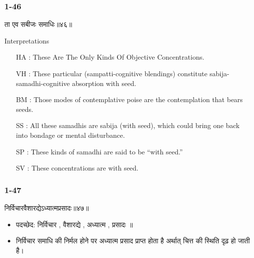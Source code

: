 \begin{frame}[fragile]\frametitle{1-46}
\begin{sanskrit}
ता एव सबीजः समाधिः॥४६॥
\end{sanskrit}

Interpretations
\begin{itemize}
\item [HA]: These Are The Only Kinds Of Objective Concentrations.
\item [VH]: These particular (sampatti-cognitive blendings) constitute sabija-samadhi-cognitive absorption with seed.
\item [BM]: Those modes of contemplative poise are the contemplation that bears seeds.
\item [SS]: All these samadhis are sabija (with seed), which could bring one back into bondage or mental disturbance.
\item [SP]: These kinds of samadhi are said to be “with seed.”
\item [SV]: These concentrations are with seed. 
\end{itemize}
	
\end{frame}

\begin{frame}[fragile]\frametitle{1-47}
\begin{sanskrit}
निर्विचारवैशारद्येऽध्यात्मप्रसादः॥४७॥
\end{sanskrit}

\begin{itemize}
\item पदच्छेद: निर्विचार , वैशारद्ये , अध्यात्म , प्रसादः ॥
\item निर्विचार समाधि की निर्मल होने पर अध्यात्म प्रसाद प्राप्त होता है अर्थात् चित्त की स्थिति दृढ़ हो जाती है।
\end{itemize}

\end{frame}

